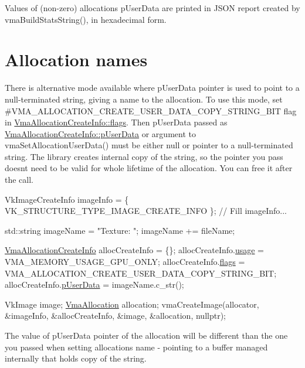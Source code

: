 Values of (non-\/zero) allocations\textquotesingle{} {\ttfamily p\+User\+Data} are printed in J\+S\+ON report created by vma\+Build\+Stats\+String(), in hexadecimal form.\hypertarget{allocation_annotation_allocation_names}{}\section{Allocation names}\label{allocation_annotation_allocation_names}
There is alternative mode available where {\ttfamily p\+User\+Data} pointer is used to point to a null-\/terminated string, giving a name to the allocation. To use this mode, set \#\+V\+M\+A\+\_\+\+A\+L\+L\+O\+C\+A\+T\+I\+O\+N\+\_\+\+C\+R\+E\+A\+T\+E\+\_\+\+U\+S\+E\+R\+\_\+\+D\+A\+T\+A\+\_\+\+C\+O\+P\+Y\+\_\+\+S\+T\+R\+I\+N\+G\+\_\+\+B\+IT flag in \hyperlink{structVmaAllocationCreateInfo_add09658ac14fe290ace25470ddd6d41b}{Vma\+Allocation\+Create\+Info\+::flags}. Then {\ttfamily p\+User\+Data} passed as \hyperlink{structVmaAllocationCreateInfo_a8259e85c272683434f4abb4ddddffe19}{Vma\+Allocation\+Create\+Info\+::p\+User\+Data} or argument to vma\+Set\+Allocation\+User\+Data() must be either null or pointer to a null-\/terminated string. The library creates internal copy of the string, so the pointer you pass doesn\textquotesingle{}t need to be valid for whole lifetime of the allocation. You can free it after the call.


\begin{DoxyCode}
VkImageCreateInfo imageInfo = \{ VK\_STRUCTURE\_TYPE\_IMAGE\_CREATE\_INFO \};
\textcolor{comment}{// Fill imageInfo...}

std::string imageName = \textcolor{stringliteral}{"Texture: "};
imageName += fileName;

\hyperlink{structVmaAllocationCreateInfo}{VmaAllocationCreateInfo} allocCreateInfo = \{\};
allocCreateInfo.\hyperlink{structVmaAllocationCreateInfo_accb8b06b1f677d858cb9af20705fa910}{usage} = VMA\_MEMORY\_USAGE\_GPU\_ONLY;
allocCreateInfo.\hyperlink{structVmaAllocationCreateInfo_add09658ac14fe290ace25470ddd6d41b}{flags} = VMA\_ALLOCATION\_CREATE\_USER\_DATA\_COPY\_STRING\_BIT;
allocCreateInfo.\hyperlink{structVmaAllocationCreateInfo_a8259e85c272683434f4abb4ddddffe19}{pUserData} = imageName.c\_str();

VkImage image;
\hyperlink{structVmaAllocation}{VmaAllocation} allocation;
vmaCreateImage(allocator, &imageInfo, &allocCreateInfo, &image, &allocation, \textcolor{keyword}{nullptr});
\end{DoxyCode}


The value of {\ttfamily p\+User\+Data} pointer of the allocation will be different than the one you passed when setting allocation\textquotesingle{}s name -\/ pointing to a buffer managed internally that holds copy of the string.


